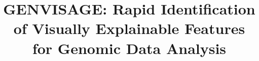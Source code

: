 \documentclass{bioinfo}
\begin{document}

\subtitle{} %
\title[short Title]{G{\large ENVISAGE}: Rapid Identification of Visually Explainable Features for Genomic Data Analysis}
\author[]{} %
\address{} %

\corresp{} %

\history{} %

\editor{} %

\abstract{}

\maketitle



{\scriptsize


}
\end{document}
